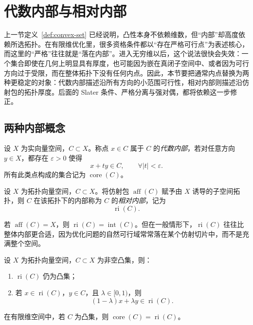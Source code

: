 \section{代数内部与相对内部}

\label{sec:4-2}

上一节定义~\ref{def:convex-set} 已经说明，凸性本身不依赖维数，但“内部”却高度依赖所选拓扑。在有限维优化里，很多资格条件都以“存在严格可行点”为表述核心，而这里的“严格”往往就是“落在内部”。进入无穷维以后，这个说法很快会失效：一个集合即使在几何上明显具有厚度，也可能因为嵌在真闭子空间中、或者因为可行方向过于受限，而在整体拓扑下没有任何内点。因此，本节要把通常内点替换为两种更稳定的对象：代数内部描述沿所有方向的小范围可行性，相对内部则描述沿仿射包的拓扑厚度。后面的 Slater 条件、严格分离与强对偶，都将依赖这一步修正。

\subsection{两种内部概念}

\begin{definition}[代数内部]\label{def:algebraic-interior}
设 $X$ 为实向量空间，$C\subset X$。称点 $x\in C$ 属于 $C$ 的\emph{代数内部}，若对任意方向 $y\in X$，都存在 $\varepsilon>0$ 使得
\[
x+ty\in C,\qquad \forall |t|<\varepsilon.
\]
所有此类点构成的集合记为 $\operatorname{core}(C)$。
\end{definition}

\begin{definition}[相对内部]\label{def:relative-interior}
设 $X$ 为拓扑向量空间，$C\subset X$。将仿射包 $\operatorname{aff}(C)$ 赋予由 $X$ 诱导的子空间拓扑，则 $C$ 在该拓扑下的内部称为 $C$ 的\emph{相对内部}，记为
\[
\operatorname{ri}(C).
\]
\end{definition}

若 $\operatorname{aff}(C)=X$，则 $\operatorname{ri}(C)=\operatorname{int}(C)$。但在一般情形下，$\operatorname{ri}(C)$ 往往比整体内部更合适，因为优化问题的自然可行域常常落在某个仿射切片中，而不是充满整个空间。

\begin{proposition}[相对内部的基本性质]\label{prop:ri-convex-properties}
设 $X$ 为拓扑向量空间，$C\subset X$ 为非空凸集，则：
\begin{enumerate}
  \item $\operatorname{ri}(C)$ 仍为凸集；
  \item 若 $x\in \operatorname{ri}(C)$，$y\in C$，且 $\lambda\in[0,1)$，则
  \[
  (1-\lambda)x+\lambda y\in \operatorname{ri}(C).
  \]
\end{enumerate}
在有限维空间中，若 $C$ 为凸集，则 $\operatorname{core}(C)=\operatorname{ri}(C)$。
\end{proposition}

